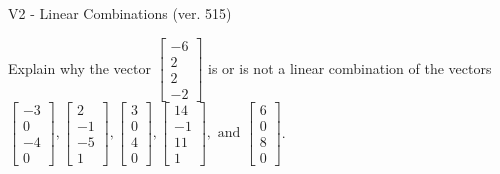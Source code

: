 \begin{exercise}
  \begin{exerciseTitle}V2 - Linear Combinations (ver. 515)\end{exerciseTitle}
  \begin{exerciseStatement}
    Explain why the vector \(\left[\begin{array}{c}
-6 \\
2 \\
2 \\
-2
\end{array}\right]\)  is or is not a linear 
	combination of the vectors \(\left[\begin{array}{c}
-3 \\
0 \\
-4 \\
0
\end{array}\right] , \left[\begin{array}{c}
2 \\
-1 \\
-5 \\
1
\end{array}\right] , \left[\begin{array}{c}
3 \\
0 \\
4 \\
0
\end{array}\right] , \left[\begin{array}{c}
14 \\
-1 \\
11 \\
1
\end{array}\right] , \text{ and } \left[\begin{array}{c}
6 \\
0 \\
8 \\
0
\end{array}\right]\).
	



\end{exerciseStatement}
\end{exercise}
